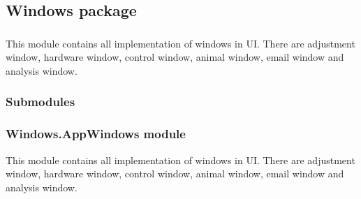 \documentclass[letterpaper,10pt,english]{sphinxmanual}
\begin{document}
\sphinxstepscope


\subsection{Windows package}
\label{\detokenize{NoSeMazeControl/Windows:windows-package}}\label{\detokenize{NoSeMazeControl/Windows::doc}}

\subsubsection{}
\label{\detokenize{NoSeMazeControl/Windows:id1}}
\sphinxAtStartPar
This module contains all implementation of windows in UI. There are adjustment window, hardware window, control window, animal window, e\sphinxhyphen{}mail window and analysis window.


\subsubsection{Submodules}
\label{\detokenize{NoSeMazeControl/Windows:submodules}}

\subsubsection{Windows.AppWindows module}
\label{\detokenize{NoSeMazeControl/Windows:module-Windows.AppWindows}}\label{\detokenize{NoSeMazeControl/Windows:windows-appwindows-module}}
\sphinxAtStartPar
This module contains all implementation of windows in UI. There are adjustment
window, hardware window, control window, animal window, e\sphinxhyphen{}mail window and
analysis window.
\end{document}
